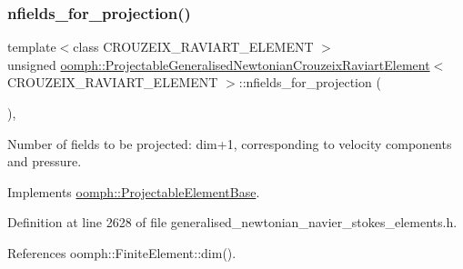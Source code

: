 \subsubsection{\texorpdfstring{nfields\+\_\+for\+\_\+projection()}{nfields\_for\_projection()}}
{\footnotesize\ttfamily template$<$class C\+R\+O\+U\+Z\+E\+I\+X\+\_\+\+R\+A\+V\+I\+A\+R\+T\+\_\+\+E\+L\+E\+M\+E\+NT $>$ \\
unsigned \hyperlink{classoomph_1_1ProjectableGeneralisedNewtonianCrouzeixRaviartElement}{oomph\+::\+Projectable\+Generalised\+Newtonian\+Crouzeix\+Raviart\+Element}$<$ C\+R\+O\+U\+Z\+E\+I\+X\+\_\+\+R\+A\+V\+I\+A\+R\+T\+\_\+\+E\+L\+E\+M\+E\+NT $>$\+::nfields\+\_\+for\+\_\+projection (\begin{DoxyParamCaption}{ }\end{DoxyParamCaption})\hspace{0.3cm}{\ttfamily [inline]}, {\ttfamily [virtual]}}



Number of fields to be projected\+: dim+1, corresponding to velocity components and pressure. 



Implements \hyperlink{classoomph_1_1ProjectableElementBase_a44634aa4049332a580d249c25564638c}{oomph\+::\+Projectable\+Element\+Base}.



Definition at line 2628 of file generalised\+\_\+newtonian\+\_\+navier\+\_\+stokes\+\_\+elements.\+h.



References oomph\+::\+Finite\+Element\+::dim().

\mbox{\label{classoomph_1_1ProjectableGeneralisedNewtonianCrouzeixRaviartElement_a20d7536f02164a9614ab0c4a15a1ad31}} 
